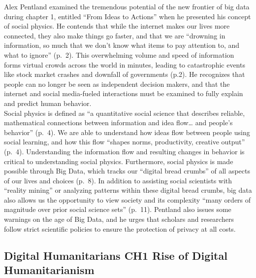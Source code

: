 \documentclass[]{book}
\theoremstyle{definition}
\theoremstyle{definition}
\theoremstyle{definition}
\theoremstyle{remark}
\begin{document}
Alex Pentland examined the tremendous potential of the new frontier of
big data during chapter 1, entitled ``From Ideas to Actions'' when he
presented his concept of social physics. He contends that while the
internet makes our lives more connected, they also make things go
faster, and that we are ``drowning in information, so much that we don't
know what items to pay attention to, and what to ignore'' (p.~2). This
overwhelming volume and speed of information forms virtual crowds across
the world in minutes, leading to catastrophic events like stock market
crashes and downfall of governments (p.2). He recognizes that people can
no longer be seen as independent decision makers, and that the internet
and social media-fueled interactions must be examined to fully explain
and predict human behavior.\\
Social physics is defined as ``a quantitative social science that
describes reliable, mathematical connections between information and
idea flow\ldots{} and people's behavior'' (p.~4). We are able to
understand how ideas flow between people using social learning, and how
this flow ``shapes norms, productivity, creative output'' (p.~4).
Understanding the information flow and resulting changes in behavior is
critical to understanding social physics. Furthermore, social physics is
made possible through Big Data, which tracks our ``digital bread
crumbs'' of all aspects of our lives and choices (p.~8). In addition to
assisting social scientists with ``reality mining'' or analyzing
patterns within these digital bread crumbs, big data also allows us the
opportunity to view society and its complexity ``many orders of
magnitude over prior social science sets'' (p.~11). Pentland also issues
some warnings on the age of Big Data, and he urges that scholars and
researchers follow strict scientific policies to ensure the protection
of privacy at all costs.

\hypertarget{digital-humanitarians-ch1-rise-of-digital-humanitarianism}{%
\subsection{\texorpdfstring{Digital Humanitarians \textbf{CH1 Rise of
Digital
Humanitarianism}}{Digital Humanitarians CH1 Rise of Digital Humanitarianism}}\label{digital-humanitarians-ch1-rise-of-digital-humanitarianism}}
\end{document}

